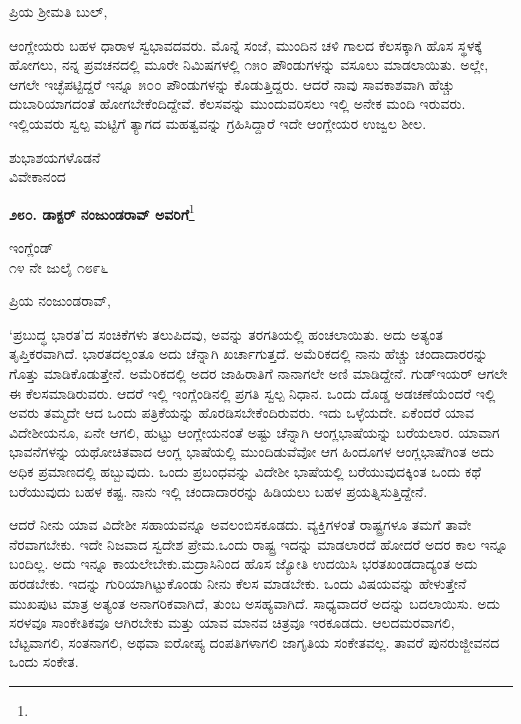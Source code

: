 \noindent
ಪ್ರಿಯ ಶ‍್ರೀಮತಿ ಬುಲ್,

ಆಂಗ್ಲೇಯರು ಬಹಳ ಧಾರಾಳ ಸ್ವಭಾವದವರು. ಮೊನ್ನೆ ಸಂಜೆ, ಮುಂದಿನ ಚಳಿ ಗಾಲದ ಕೆಲಸಕ್ಕಾಗಿ ಹೊಸ ಸ್ಥಳಕ್ಕೆ ಹೋಗಲು, ನನ್ನ ಪ್ರವಚನದಲ್ಲಿ ಮೂರೇ ನಿಮಿಷಗಳಲ್ಲಿ ೧೫೦ ಪೌಂಡುಗಳನ್ನು ವಸೂಲು ಮಾಡಲಾಯಿತು. ಅಲ್ಲೇ, ಆಗಲೇ ಇಚ್ಛೆಪಟ್ಟಿದ್ದರೆ ಇನ್ನೂ ೫೦೦ ಪೌಂಡುಗಳನ್ನು ಕೊಡುತ್ತಿದ್ದರು. ಆದರೆ ನಾವು ಸಾವಕಾಶವಾಗಿ ಹೆಚ್ಚು ದುಬಾರಿಯಾಗದಂತೆ ಹೋಗಬೇಕೆಂದಿದ್ದೇವೆ. ಕೆಲಸವನ್ನು ಮುಂದುವರಿಸಲು ಇಲ್ಲಿ ಅನೇಕ ಮಂದಿ ಇರುವರು. ಇಲ್ಲಿಯವರು ಸ್ವಲ್ಪ ಮಟ್ಟಿಗೆ ತ್ಯಾಗದ ಮಹತ್ವವನ್ನು ಗ್ರಹಿಸಿದ್ದಾರೆ \enginline{-} ಇದೇ ಆಂಗ್ಲೇಯರ ಉಜ್ವಲ ಶೀಲ.

\vspace{-0.5cm}

{\flushright
ಶುಭಾಶಯಗಳೊಡನೆ\\ವಿವೇಕಾನಂದ\par}

\begin{center}
\textbf{೨೮೦. ಡಾಕ್ಟರ್ ನಂಜುಂಡರಾವ್ ಅವರಿಗೆ}\footnote{}
\end{center}

\begin{flushright}
ಇಂಗ್ಲೆಂಡ್\\೧೪ ನೇ ಜುಲೈ ೧೮೯೬
\end{flushright}

\noindent
ಪ್ರಿಯ ನಂಜುಂಡರಾವ್,

\vspace{0.1cm}

‘ಪ್ರಬುದ್ಧ ಭಾರತ’ದ ಸಂಚಿಕೆಗಳು ತಲುಪಿದವು, ಅವನ್ನು ತರಗತಿಯಲ್ಲಿ ಹಂಚಲಾಯಿತು. ಅದು ಅತ್ಯಂತ ತೃಪ್ತಿಕರವಾಗಿದೆ. ಭಾರತದಲ್ಲಂತೂ ಅದು ಚೆನ್ನಾಗಿ ಖರ್ಚಾಗು\break ತ್ತದೆ. ಅಮೆರಿಕದಲ್ಲಿ ನಾನು ಹೆಚ್ಚು ಚಂದಾದಾರರನ್ನು ಗೊತ್ತು ಮಾಡಿಕೊಡುತ್ತೇನೆ. ಅಮೆರಿಕದಲ್ಲಿ ಅದರ ಜಾಹಿರಾತಿಗೆ ನಾನಾಗಲೇ ಅಣಿ ಮಾಡಿದ್ದೇನೆ. ಗುಡ್‌ಇಯರ್ ಆಗಲೇ ಈ ಕೆಲಸಮಾಡಿರುವರು. ಆದರೆ ಇಲ್ಲಿ ಇಂಗ್ಲೆಂಡಿನಲ್ಲಿ ಪ್ರಗತಿ ಸ್ವಲ್ಪ ನಿಧಾನ. ಒಂದು ದೊಡ್ಡ ಅಡಚಣೆಯೆಂದರೆ ಇಲ್ಲಿ ಅವರು ತಮ್ಮದೇ ಆದ ಒಂದು ಪತ್ರಿಕೆಯನ್ನು ಹೊರಡಿಸಬೇಕೆಂದಿರುವರು. ಇದು ಒಳ್ಳೆಯದೇ. ಏಕೆಂದರೆ ಯಾವ ವಿದೇಶೀಯನೂ, ಏನೇ ಆಗಲಿ, ಹುಟ್ಟು ಆಂಗ್ಲೇಯನಂತೆ ಅಷ್ಟು ಚೆನ್ನಾಗಿ ಆಂಗ್ಲಭಾಷೆಯನ್ನು ಬರೆಯಲಾರ. ಯಾವಾಗ ಭಾವನೆಗಳನ್ನು ಯಥೋಚಿತವಾದ ಆಂಗ್ಲ ಭಾಷೆಯಲ್ಲಿ ಮುಂದಿಡುವೆವೋ ಆಗ ಹಿಂದೂಗಳ ಆಂಗ್ಲಭಾಷೆಗಿಂತ ಅದು ಅಧಿಕ ಪ್ರಮಾಣದಲ್ಲಿ ಹಬ್ಬುವುದು. ಒಂದು ಪ್ರಬಂಧವನ್ನು ವಿದೇಶೀ ಭಾಷೆಯಲ್ಲಿ ಬರೆಯುವುದಕ್ಕಿಂತ ಒಂದು ಕಥೆ ಬರೆಯುವುದು ಬಹಳ ಕಷ್ಟ. ನಾನು ಇಲ್ಲಿ ಚಂದಾದಾರರನ್ನು ಹಿಡಿಯಲು ಬಹಳ ಪ್ರಯತ್ನಿಸುತ್ತಿದ್ದೇನೆ.

\vspace{0.1cm}

ಆದರೆ ನೀನು ಯಾವ ವಿದೇಶೀ ಸಹಾಯವನ್ನೂ ಅವಲಂಬಿಸಕೂಡದು. ವ್ಯಕ್ತಿಗಳಂತೆ ರಾಷ್ಟ್ರಗಳೂ ತಮಗೆ ತಾವೇ ನೆರವಾಗಬೇಕು. ಇದೇ ನಿಜವಾದ ಸ್ವದೇಶ ಪ್ರೇಮ.ಒಂದು ರಾಷ್ಟ್ರ ಇದನ್ನು ಮಾಡಲಾರದೆ ಹೋದರೆ ಅದರ ಕಾಲ ಇನ್ನೂ ಬಂದಿಲ್ಲ. ಅದು ಇನ್ನೂ ಕಾಯಲೇಬೇಕು.ಮದ್ರಾಸಿನಿಂದ ಹೊಸ ಜ್ಯೋತಿ ಉದಯಿಸಿ ಭರತಖಂಡದಾದ್ಯಂತ ಅದು ಹರಡಬೇಕು. ಇದನ್ನು ಗುರಿಯಾಗಿಟ್ಟುಕೊಂಡು ನೀನು ಕೆಲಸ ಮಾಡಬೇಕು. ಒಂದು ವಿಷಯವನ್ನು ಹೇಳುತ್ತೇನೆ\enginline{-} ಮುಖಪುಟ ಮಾತ್ರ ಅತ್ಯಂತ ಅನಾಗರಿಕವಾಗಿದೆ, ತುಂಬ ಅಸಹ್ಯವಾಗಿದೆ. ಸಾಧ್ಯವಾದರೆ ಅದನ್ನು ಬದಲಾಯಿಸು. ಅದು ಸರಳವೂ ಸಾಂಕೇತಿಕವೂ ಆಗಿರಬೇಕು ಮತ್ತು ಯಾವ ಮಾನವ ಚಿತ್ರವೂ ಇರಕೂಡದು. ಆಲದಮರವಾಗಲಿ, ಬೆಟ್ಟವಾಗಲಿ, ಸಂತನಾಗಲಿ, ಅಥವಾ ಐರೋಪ್ಯ ದಂಪತಿಗಳಾಗಲಿ ಜಾಗೃತಿಯ ಸಂಕೇತವಲ್ಲ. ತಾವರೆ ಪುನರುಜ್ಜೀವನದ ಒಂದು ಸಂಕೇತ.

